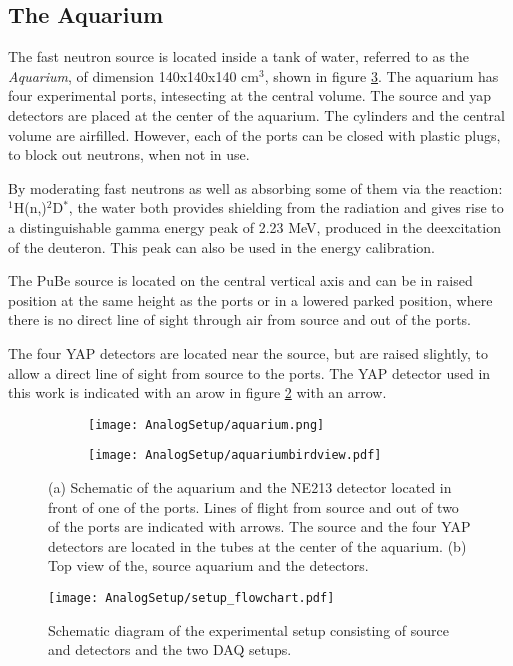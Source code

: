 \documentclass[main.tex]{subfiles}
\begin{document}
\subsection{The Aquarium}
The fast neutron source is located inside a tank of water, referred to as the \textit{Aquarium}, of dimension 140x140x140 \si{\cm}${}^\text{3}$, shown in figure \ref{fig:aquarium}. The aquarium has four experimental ports, intesecting at the central volume. The source and yap detectors are placed at the center of the aquarium. The cylinders and the central volume are airfilled. However, each of the ports can be closed with plastic plugs, to block out neutrons, when not in use.

By moderating fast neutrons as well as absorbing some of them via the reaction: $^{\text{1}}$H(n,\textgamma)$^{\text{2}}$D$^*$, the water both provides shielding from the radiation and gives rise to a distinguishable gamma energy peak of 2.23 MeV, produced in the deexcitation of the deuteron. This peak can also be used in the energy calibration.

The PuBe source is located on the central vertical axis and can be in raised position at the same height as the ports or in a lowered parked position, where there is no direct line of sight through air from source and out of the ports.

The four YAP detectors are located near the source, but are raised slightly, to allow a direct line of sight from source to the ports. The YAP detector used in this work is indicated with an arow in figure \ref{fig:aquarium_bird} with an arrow.
\begin{figure}[ht]
	\center
	\begin{subfigure}[b]{0.39\textwidth}
	    \centering
    	    \texttt{[image: AnalogSetup/aquarium.png]}
        	\caption[Aquarium 3D]{}
	    \label{fig:aquarium_pers} 
	\end{subfigure}
	\begin{subfigure}[b]{0.6\textwidth}
	    \centering
    	    \texttt{[image: AnalogSetup/aquariumbirdview.pdf]}
        	\caption[Aquarium 2D, top view]{}
	    \label{fig:aquarium_bird} 
	\end{subfigure}
	\caption[CAD drawing of the aqurium]{(a) Schematic of the aquarium and the NE213 detector located in front of one of the ports. Lines of flight from source and out of two of the ports are indicated with arrows. The source and the four YAP detectors are located in the tubes at the center of the aquarium. (b) Top view of the, source aquarium and the detectors.}
	\label{fig:aquarium}
\end{figure}
\begin{figure}[h]
    \centering
        \texttt{[image: AnalogSetup/setup\_flowchart.pdf]}
        \caption[Diagram of experimental setup]{Schematic diagram of the experimental setup consisting of source and detectors and the two DAQ setups.}
    \label{fig:setup}
\end{figure}
\end{document}
